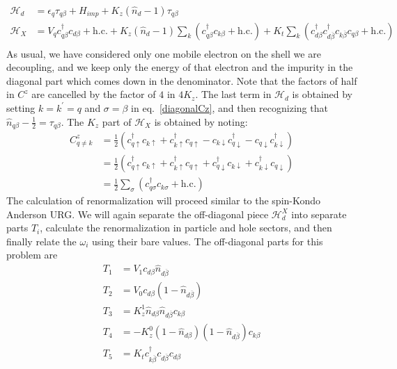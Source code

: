 \documentclass[twoside]{report}
\numberwithin{equation}{section}
\begin{document}
\begin{equation}\begin{aligned}
	\mathcal{H}_d &= \epsilon_q \tau_{q\beta} + H_{imp} + K_z \left(\hat n_d -1\right)\tau_{q\beta}\\
	\mathcal{H}_X &= V_qc^\dagger_{q\beta}c_{d\beta} + \text{h.c.} + K_z \left(\hat n_d -1\right)\sum_k \left(c^\dagger_{q\beta}c_{k\beta} + \text{h.c.}\right) + K_t \sum_k \left(c^\dagger_{d\beta}c^\dagger_{d\overline\beta}c_{k\overline\beta}c_{q\beta} + \text{h.c.}\right) \\
\end{aligned}\end{equation}
As usual, we have considered only one mobile electron on the shell we are decoupling, and we keep only the energy of that electron and the impurity in the diagonal part which comes down in the denominator.
Note that the factors of half in \(C^z\) are cancelled by the factor of \(4\) in \(4K_z\).
The last term in \(\mathcal{H}_d\) is obtained by setting \(k=k^\prime=q\) and \(\sigma=\beta\) in eq.~\ref{diagonalCz}, and then recognizing that \(\hat n_{q\beta} - \frac{1}{2} = \tau_{q\beta}\).
The \(K_z\) part of \(\mathcal{H}_X\) is obtained by noting:
\begin{equation}\begin{aligned}
	C^z_{q\neq k} &= \frac{1}{2}\left(c^\dagger_{q\uparrow}c_{k \uparrow} + c^\dagger_{k\uparrow}c_{q \uparrow} - c_{k\downarrow}c^\dagger_{q \downarrow} - c_{q\downarrow}c^\dagger_{k\downarrow}\right) \\
		      &= \frac{1}{2}\left(c^\dagger_{q\uparrow}c_{k \uparrow} + c^\dagger_{k\uparrow}c_{q \uparrow} + c^\dagger_{q \downarrow}c_{k\downarrow} + c^\dagger_{k\downarrow}c_{q\downarrow}\right)\\
	&= \frac{1}{2}\sum_{\sigma}\left(c^\dagger_{q\sigma}c_{k\sigma} + \text{h.c.}\right)
\end{aligned}\end{equation}
The calculation of renormalization will proceed similar to the spin-Kondo Anderson URG.
We will again separate the off-diagonal piece \(\mathcal{H}_d^X\) into separate parts \(T_i\), calculate the renormalization in particle and hole sectors, and then finally relate the \(\omega_i\) using their bare values.
The off-diagonal parts for this problem are
\begin{equation}\begin{aligned}
	T_1 &= V_1 c_{d\beta}\hat n_{d\overline\beta}\\
	T_2 &= V_0 c_{d\beta}\left(1 - \hat n_{d\overline\beta}\right)\\
	T_3 &= K_z^1 \hat n_{d\beta}\hat n_{d\overline\beta}c_{k\beta}\\
	T_4 &= -K_z^0 \left(1 - \hat n_{d\beta}\right)\left(1 - \hat n_{d\overline\beta}\right)c_{k\beta}\\
	T_5 &= K_t c^\dagger_{k\overline\beta}c_{d\overline\beta}c_{d\beta}\\
\end{aligned}\end{equation}
\end{document}

